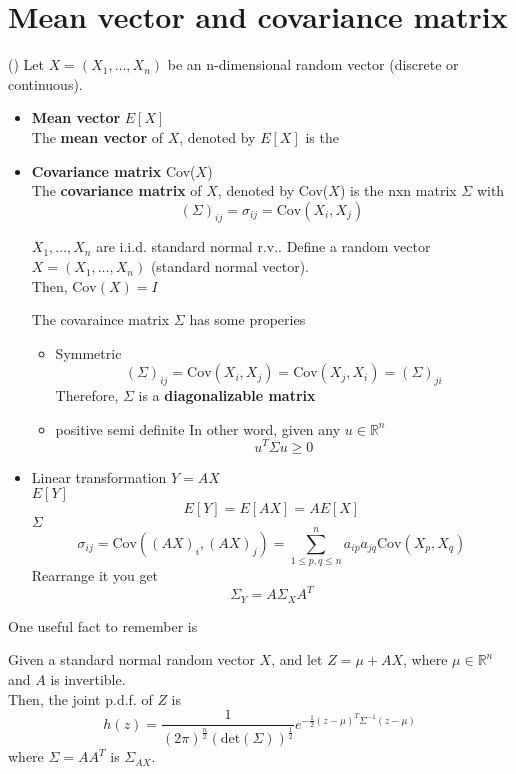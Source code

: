 \section{Mean vector and covariance matrix}
(\cite*{Und_Chatterjee})
Let \(X = (X_1, \dots, X_n)\) be an n-dimensional random vector (discrete or continuous). 
\begin{itemize}
    \item \textbf{Mean vector} \(E[X]\)\\
    The \textbf{mean vector} of  \(X\), denoted by \(E[X]\) is the  
    \item \textbf{Covariance matrix} Cov(\(X\))\\
    The \textbf{covariance matrix} of \(X\), denoted by Cov(\(X\)) is the nxn matrix \(\Sigma\) with 
    \[
        (\Sigma )_{ij} = \sigma_{ij} = \text{Cov} (X_i,X_j)
    \]   
    \begin{eg}
        \(X_1, \dots, X_n\) are i.i.d. standard normal r.v.. Define a random vector \(X = (X_1, \dots,X_n)\) (standard normal vector). \\
        Then, \(\text{Cov} (X) = I\)  
    \end{eg}
    \begin{remark}
        The covaraince matrix \(\Sigma \) has some properies  
        \begin{itemize}
            \item Symmetric
            \[
                (\Sigma )_{ij} = \text{Cov}(X_{i} ,X_{j} ) = \text{Cov} (X_{j} ,X_{i}) = (\Sigma)_{ji} 
            \]
            Therefore, \(\Sigma \) is a \textbf{diagonalizable matrix} 
            \item positive semi definite
                In other word, given any \(u \in \mathbb{R}^n\) 
                \[
                    u^T \Sigma u \geq 0
                \]
    

        \end{itemize}
    \end{remark}
    \item Linear transformation \(Y = AX\)\\ 
    \(E[Y]\) 
    \[
        E[Y]  = E[AX] = AE[X]
    \]
    \(\Sigma \) 
    \[
        \sigma_{ij} =  \text{Cov} ((AX)_i, (AX)_{j} ) = \sum_{1\leq p,q \leq n}^{n} a_{ip}a_{jq} \text{Cov}(X_{p} ,X_{q} ) 
    \]
    Rearrange it you get 
    \[
        \Sigma_Y = A \Sigma_X A^T
    \] 
\end{itemize}
One useful fact to remember is 
\begin{theorem}
    Given a standard normal random vector \(X\), and let \(Z = \mu  + AX\), where \(\mu \in \mathbb{R}^n\) and \(A\) is invertible. 
    \\Then, the joint p.d.f. of \(Z\) is 
    \[
        h(z) = \frac{1}{(2\pi)^{\frac{n}{2}} (\text{det}(\Sigma) )^{\frac{1}{2}}} e^{-\frac{1}{2} (z-\mu )^T \Sigma ^{-1} (z-\mu ) }
    \]     
    where \(\Sigma  = A A^T\) is \(\Sigma_{AX} \). 
\end{theorem}
